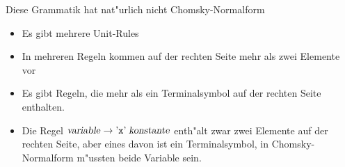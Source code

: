 \begin{loesung}
Diese Grammatik hat nat"urlich nicht Chomsky-Normalform
\begin{itemize}
\item Es gibt mehrere Unit-Rules
\item In mehreren Regeln kommen auf der rechten Seite mehr als
zwei Elemente vor
\item Es gibt Regeln, die mehr als ein Terminalsymbol auf der rechten
Seite enthalten.
\item Die Regel
$\text{\textsl{variable}}\to \text{'{\tt x}'}\;\text{\textsl{konstante}}$
enth"alt zwar zwei Elemente auf der rechten Seite, aber eines davon
ist ein Terminalsymbol, in Chomsky-Normalform m"ussten beide Variable
sein.
\end{itemize}
\end{loesung}
